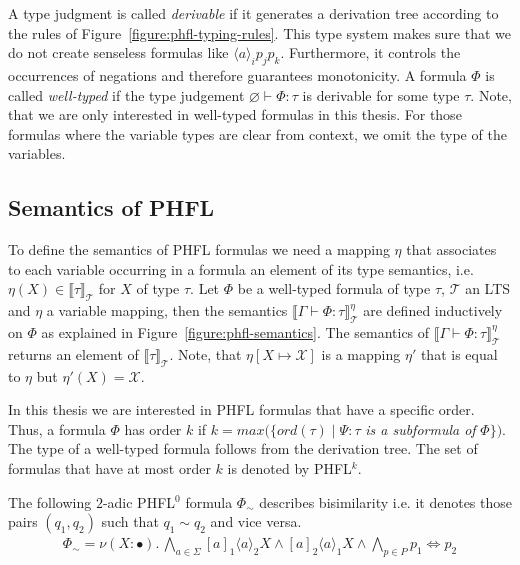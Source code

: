 A type judgment is called \textit{derivable} if it generates a derivation tree according to the rules of
Figure~\ref{figure:phfl-typing-rules}. This type system makes sure that we do not create senseless formulas like
$\langle a \rangle_i p_j p_k$. Furthermore, it controls the occurrences of negations and therefore guarantees monotonicity. A
formula $\Phi$ is called \textit{well-typed} if the type judgement $\varnothing \vdash \Phi:\tau$ is derivable for some
type $\tau$. Note, that we are only interested in well-typed formulas in this thesis. For those formulas where the variable
types are clear from context, we omit the type of the variables.

\subsection{Semantics of PHFL}\label{subsec:phflSemantics}

To define the semantics of PHFL formulas we need a mapping $\eta$ that associates to each variable occurring in a formula an element of its
type semantics, i.e. $\eta(X) \in \llbracket\tau\rrbracket_\mathcal{T}$ for $X$ of type $\tau$. Let $\Phi$ be a
well-typed formula of type $\tau$, $\mathcal{T}$ an LTS and $\eta$ a variable mapping, then the semantics
$\llbracket\Gamma \vdash \Phi\colon \tau \rrbracket^\eta_\mathcal{T}$ are defined inductively on $\Phi$ as explained in Figure~\ref{figure:phfl-semantics}. The semantics of $\llbracket\Gamma \vdash \Phi\colon \tau \rrbracket^\eta_\mathcal{T}$ returns an element of $\llbracket\tau\rrbracket_\mathcal{T}$. 
Note, that $\eta[X \mapsto \mathcal{X}]$ is a mapping $\eta'$ that is equal to $\eta$ but $\eta'(X) = \mathcal{X}$.

In this thesis we are interested in PHFL formulas that have a specific order. Thus, a formula $\Phi$ has order $k$
if $k = max(\{ord(\tau)\mid \Psi \colon \tau$ \textit{is a subformula of} $\Phi\})$. The type of a well-typed formula follows from the derivation tree. The set of formulas that have at most
order $k$ is denoted by PHFL$^k$.

\begin{example}{\cite{lange2014capturing}}
    \label{example:phfl_order_0}
    The following $2$-adic PHFL$^0$ formula $\Phi_\sim$ describes bisimilarity i.e. it denotes
    those pairs $(q_1, q_2)$ such that $q_1 \sim q_2$ and vice versa.
    \begin{align*}
        \Phi_\sim = \nu (X \colon \bullet).\,
        \underset{a \in \Sigma}{\bigwedge} [a]_1 \langle a \rangle_2 X \wedge [a]_2 \langle a \rangle_1 X \wedge
        \underset{p \in P}{\bigwedge} p_1 \Leftrightarrow p_2
    \end{align*}
\end{example}

